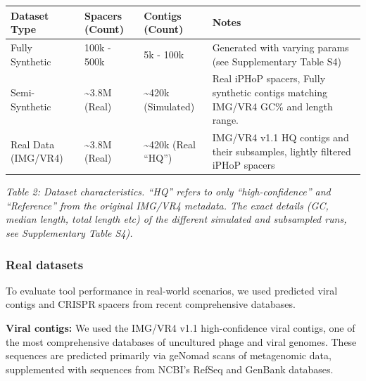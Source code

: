 \documentclass[
]{article}
\begin{document}
\begin{longtable}[]{@{}
  >{\raggedright\arraybackslash}p{}
  >{\raggedright\arraybackslash}p{}
  >{\raggedright\arraybackslash}p{}
  >{\raggedright\arraybackslash}p{}@{}}
\toprule\noalign{}
\begin{minipage}[b]{\linewidth}\raggedright
\textbf{Dataset Type}
\end{minipage} & \begin{minipage}[b]{\linewidth}\raggedright
\textbf{Spacers (Count)}
\end{minipage} & \begin{minipage}[b]{\linewidth}\raggedright
\textbf{Contigs (Count)}
\end{minipage} & \begin{minipage}[b]{\linewidth}\raggedright
\textbf{Notes}
\end{minipage} \\
\midrule\noalign{}
\endhead
\bottomrule\noalign{}
\endlastfoot
Fully Synthetic & 100k - 500k & 5k - 100k & Generated with varying
params (see Supplementary Table S4) \\
Semi-Synthetic & \textasciitilde3.8M (Real) & \textasciitilde420k
(Simulated) & Real iPHoP spacers, Fully synthetic contigs matching
IMG/VR4 GC\% and length range. \\
Real Data (IMG/VR4) & \textasciitilde3.8M (Real) & \textasciitilde420k
(Real ``HQ'') & IMG/VR4 v1.1 HQ contigs and their subsamples, lightly
filtered iPHoP spacers \\
\end{longtable}

\emph{Table 2: Dataset characteristics. ``HQ'' refers to only
``high-confidence'' and ``Reference'' from the original IMG/VR4
metadata. The exact details (GC, median length, total length etc) of the
different simulated and subsampled runs, see Supplementary Table S4).}

\subsubsection{Real datasets}\label{sec-real-data}

To evaluate tool performance in real-world scenarios, we used predicted
viral contigs and CRISPR spacers from recent comprehensive databases.

\textbf{Viral contigs:} We used the IMG/VR4 v1.1 high-confidence viral
contigs\autocite{camargo_img_vr4_2023}, one of the most comprehensive
databases of uncultured phage and viral genomes. These sequences are
predicted primarily via geNomad\autocite{camargo_genomad_2024} scans of
metagenomic data, supplemented with sequences from NCBI's RefSeq and
GenBank databases.
\end{document}
